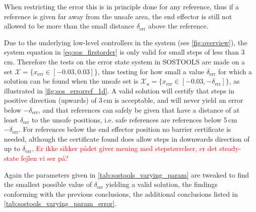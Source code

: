 When restricting the error this is in principle done for any reference, thus if a reference is given far away from the unsafe area, the end effector is still not allowed to be more than the small distance $\delta_\text{err}$ above the reference. 


Due to the underlying low-level controllers in the system (see \autoref{fig:overview}), the system equation in \autoref{eq:sos_firstorder} is only valid for small steps of less than 3\,cm. Therefore the tests on the error state system in SOSTOOLS are made on a set $\mathcal{X}=\{x_\text{err}\in[-0.03,0.03] \}$, thus testing for how small a value $\delta_\text{err}$ for which a solution can be found when the unsafe set is $\mathcal{X}_u=\{x_\text{err}\in[-0.03,-\delta_\text{err}] \}$, as illustrated in \autoref{fig:sos_errorref_1d}. A valid solution will certify that steps in positive direction (upwards) of 3\,cm is acceptable, and will never yield an error below $-\delta_\text{err}$, and that references can safely be given that have a distance of at least $\delta_\text{err}$ to the unsafe positions, i.e. safe references are references below 5\,cm $-\delta_\text{err}$. For references below the end effector position no barrier certificate is needed, although the certificate found does allow steps in downwards direction of up to $\delta_\text{err}$. \textcolor{red}{Er ikke sikker p\aa  det giver mening med stepst\o rrelser, er det steady-state fejlen vi ser p\aa ?}

Again the parameters given in \autoref{tab:sostools_varying_param} are tweaked to find the smallest possible value of $\delta_\text{err}$ yielding a valid solution, the findings conforming with the previous conclusions, the additional conclusions listed in \autoref{tab:sostools_varying_param_error}.

